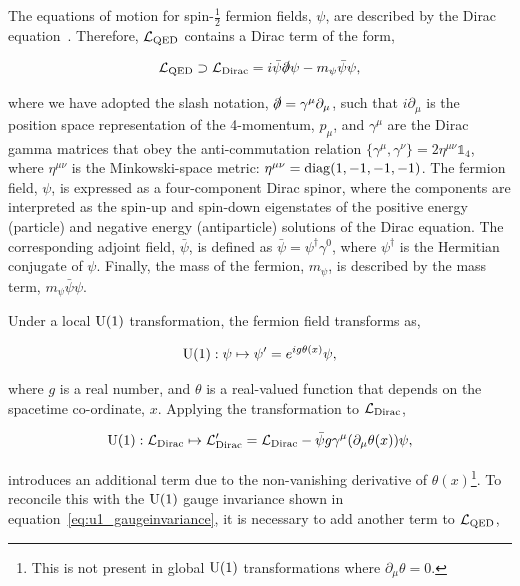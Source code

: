 The equations of motion for spin-$\frac{1}{2}$ fermion fields, $\psi$, are described by the Dirac equation~\cite{doi:10.1098_rspa.1928.0023}. Therefore, $\mathcal{L}_{\rm{QED}}$ contains a Dirac term of the form,

\begin{equation}
    \mathcal{L}_{\rm{QED}} \supset \mathcal{L}_{\rm{Dirac}} = i\bar{\psi}\slashed{\partial}\psi - m_{\psi}\bar{\psi}\psi,
\end{equation}

\noindent
where we have adopted the slash notation, $\slashed{\partial}=\gamma^\mu\partial_\mu$, such that $i\partial_\mu$ is the position space representation of the 4-momentum, $p_\mu$, and $\gamma^\mu$ are the Dirac gamma matrices that obey the anti-commutation relation $\{\gamma^\mu,\gamma^\nu\}=2\eta^{\mu\nu}\mathbb{1}_4$, where $\eta^{\mu\nu}$ is the Minkowski-space metric: $\eta^{\mu\nu}={\rm{diag}}(1,-1,-1,-1)$. The fermion field, $\psi$, is expressed as a four-component Dirac spinor, where the components are interpreted as the spin-up and spin-down eigenstates of the positive energy (particle) and negative energy (antiparticle) solutions of the Dirac equation. The corresponding adjoint field, $\bar{\psi}$, is defined as $\bar{\psi}=\psi^{\dagger}\gamma^0$, where $\psi^{\dagger}$ is the Hermitian conjugate of $\psi$. Finally, the mass of the fermion, $m_{\psi}$, is described by the mass term, $m_{\psi}\bar{\psi}\psi$.

Under a local ${\rm{U}}(1)$ transformation, the fermion field transforms as,

\begin{equation}
    {\rm{U}}(1): \psi \mapsto \psi' = e^{ig\theta(x)}\psi,
\end{equation}

\noindent
where $g$ is a real number, and $\theta$ is a real-valued function that depends on the spacetime co-ordinate, $x$. Applying the transformation to $\mathcal{L}_{\rm{Dirac}}$,

\begin{equation}\label{eq:u1_dirac}
    {\rm{U}}(1): \mathcal{L}_{\rm{Dirac}} \mapsto \mathcal{L}_{\rm{Dirac}}' = \mathcal{L}_{\rm{Dirac}} - \bar{\psi}g\gamma^\mu(\partial_\mu\theta(x))\psi,
\end{equation}

\noindent
introduces an additional term due to the non-vanishing derivative of $\theta(x)$\footnote{This is not present in global ${\rm{U}}(1)$ transformations where $\partial_\mu\theta=0$.}. To reconcile this with the ${\rm{U}}(1)$ gauge invariance shown in equation~\ref{eq:u1_gaugeinvariance}, it is necessary to add another term to $\mathcal{L}_{\rm{QED}}$,

